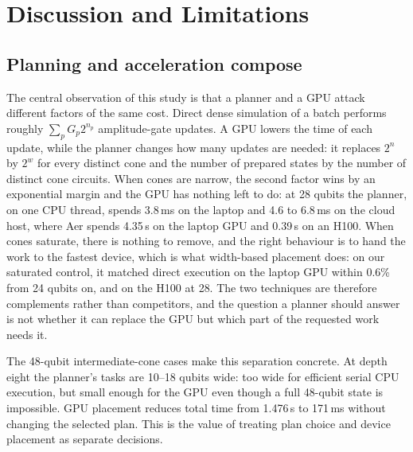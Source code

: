 \section{Discussion and Limitations}
\label{sec:discussion}
\subsection{Planning and acceleration compose}
The central observation of this study is that a planner and a GPU attack different factors of the same cost. Direct dense simulation of a batch performs roughly $\sum_p G_p 2^{n_p}$ amplitude-gate updates. A GPU lowers the time of each update, while the planner changes how many updates are needed: it replaces $2^{n}$ by $2^{w}$ for every distinct cone and the number of prepared states by the number of distinct cone circuits. When cones are narrow, the second factor wins by an exponential margin and the GPU has nothing left to do: at 28 qubits the planner, on one CPU thread, spends 3.8\,ms on the laptop and 4.6 to 6.8\,ms on the cloud host, where Aer spends 4.35\,s on the laptop GPU and 0.39\,s on an H100. When cones saturate, there is nothing to remove, and the right behaviour is to hand the work to the fastest device, which is what width-based placement does: on our saturated control, it matched direct execution on the laptop GPU within 0.6\% from 24 qubits on, and on the H100 at 28. The two techniques are therefore complements rather than competitors, and the question a planner should answer is not whether it can replace the GPU but which part of the requested work needs it.

The 48-qubit intermediate-cone cases make this separation concrete. At depth eight the planner's tasks are 10--18 qubits wide: too wide for efficient serial CPU execution, but small enough for the GPU even though a full 48-qubit state is impossible. GPU placement reduces total time from 1.476\,s to 171\,ms without changing the selected plan. This is the value of treating plan choice and device placement as separate decisions.

